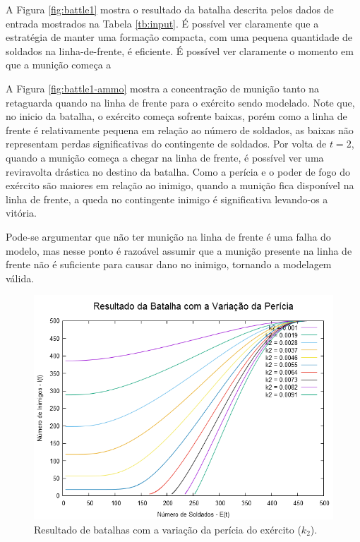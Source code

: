 \documentclass{article}
\begin{document}
A Figura \ref{fig:battle1} mostra o resultado da batalha descrita pelos dados de entrada mostrados na Tabela \ref{tb:input}. É possível ver claramente que a estratégia de manter uma formação compacta, com uma pequena quantidade de soldados na linha-de-frente, é eficiente. É possível ver claramente o momento em que a munição começa a 

A Figura \ref{fig:battle1-ammo} mostra a concentração de munição tanto na retaguarda quando na linha de frente para o exército sendo modelado. Note que, no inicio da batalha, o exército começa sofrente baixas, porém como a linha de frente é relativamente pequena em relação ao número de soldados, as baixas não representam perdas significativas do contingente de soldados. Por volta de $t = 2$, quando a munição começa a chegar na linha de frente, é possível ver uma reviravolta drástica no destino da batalha. Como a perícia e o poder de fogo do exército são maiores em relação ao inimigo, quando a munição fica disponível na linha de frente, a queda no contingente inimigo é significativa levando-os a vitória.

Pode-se argumentar que não ter munição na linha de frente é uma falha do modelo, mas nesse ponto é razoável assumir que a munição presente na linha de frente não é suficiente para causar dano no inimigo, tornando a modelagem válida.

\begin{figure}[ht]
	\centering
	\includegraphics[scale=0.4]{figs/battle_army_skill_variation.png}
	\caption{Resultado de batalhas com a variação da perícia do exército ($k_2$).}
	\label{fig:army-skill-variation}
\end{figure}
\end{document}
